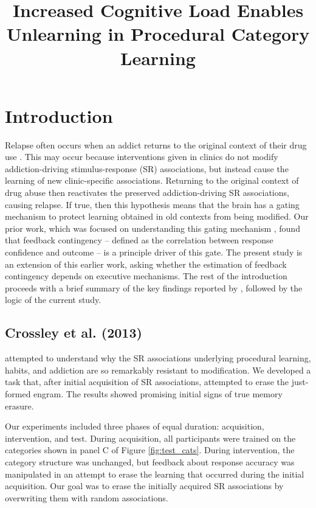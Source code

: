 \documentclass[apacite,draftfirst,man]{apa6}
\title{Increased Cognitive Load Enables Unlearning in Procedural Category Learning}
\begin{document}
\maketitle

\section*{Introduction}
Relapse often occurs when an addict returns to the original context of their
drug use \cite{higgins_outpatient_1995}. This may occur because interventions
given in clinics do not modify addiction-driving stimulus-response (SR)
associations, but instead cause the learning of new clinic-specific
associations. Returning to the original context of drug abuse then reactivates
the preserved addiction-driving SR associations, causing relapse. If true, then
this hypothesis means that the brain has a gating mechanism to protect learning
obtained in old contexts from being modified. Our prior work, which was focused
on understanding this gating mechanism \cite{crossley_erasing_2013}, found that
feedback contingency -- defined as the correlation between response confidence
and outcome -- is a principle driver of this gate. The present study is an
extension of this earlier work, asking whether the estimation of feedback
contingency depends on executive mechanisms. The rest of the introduction
proceeds with a brief summary of the key findings reported by
\cite{crossley_erasing_2013}, followed by the logic of the current study.

\subsection*{Crossley et al. (2013)}
 attempted to understand why the SR associations
underlying procedural learning, habits, and addiction are so remarkably
resistant to modification. We developed a task that, after initial acquisition
of SR associations, attempted to erase the just-formed engram. The results
showed promising initial signs of true memory erasure.

Our experiments included three phases of equal duration: acquisition,
intervention, and test. During acquisition, all participants were trained on the
categories shown in panel C of Figure \ref{fig:test_cats}. During
intervention, the category structure was unchanged, but feedback about response
accuracy was manipulated in an attempt to erase the learning that occurred
during the initial acquisition. Our goal was to erase the initially acquired SR
associations by overwriting them with random associations.
\end{document}
